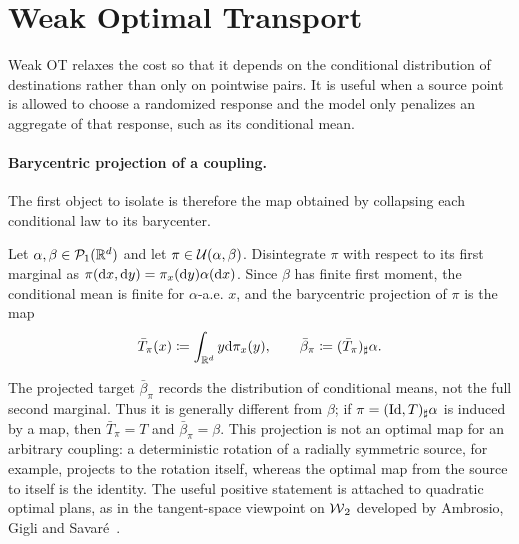 

\section{Weak Optimal Transport}
\label{sec-weak-ot}

Weak OT relaxes the cost so that it depends on the conditional distribution of destinations rather than only on pointwise pairs. It is useful when a source point is allowed to choose a randomized response and the model only penalizes an aggregate of that response, such as its conditional mean.

\paragraph{Barycentric projection of a coupling.}
The first object to isolate is therefore the map obtained by collapsing each conditional law to its barycenter.

\begin{defn}\label{def-barycentric-projection}
	Let $\alpha,\beta\in\mathcal{P}_1(\mathbb{R}^d)$ and let $\pi\in\mathcal{U}(\alpha,\beta)$. Disintegrate $\pi$ with respect to its first marginal as
	$\pi(\mathrm{d} x,\mathrm{d} y)=\pi_x(\mathrm{d} y)\alpha(\mathrm{d} x)$. Since $\beta$ has finite first moment, the conditional mean is finite for $\alpha$-a.e. $x$, and the barycentric projection of $\pi$ is the map
	\begin{equation}\label{eq-barycentric-projection}
		\bar T_\pi(x)
		\coloneqq
		\int_{\mathbb{R}^d}y\mathrm{d}\pi_x(y),
		\qquad
		\bar\beta_\pi
		\coloneqq
		(\bar T_\pi)_\sharp\alpha.
	\end{equation}
\end{defn}
The projected target $\bar\beta_\pi$ records the distribution of conditional means, not the full second marginal. Thus it is generally different from $\beta$; if $\pi=(\mathrm{Id},T)_\sharp\alpha$ is induced by a map, then $\bar T_\pi=T$ and $\bar\beta_\pi=\beta$. This projection is not an optimal map for an arbitrary coupling: a deterministic rotation of a radially symmetric source, for example, projects to the rotation itself, whereas the optimal map from the source to itself is the identity. The useful positive statement is attached to quadratic optimal plans, as in the tangent-space viewpoint on $\operatorname{\mathcal{W}}_2$ developed by Ambrosio, Gigli and Savar{\'e}~\cite[Chap.~7]{ambrosio2006gradient}.


